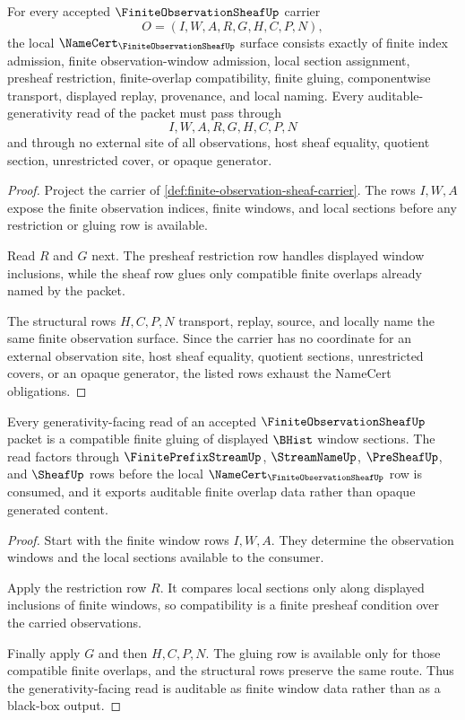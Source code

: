 \begin{theorem}
\label{thm:finite-observation-sheaf-namecert-obligations}
For every accepted $\FiniteObservationSheafUp$ carrier
$$
O=(I,W,A,R,G,H,C,P,N),
$$
the local $\NameCert_{\FiniteObservationSheafUp}$ surface consists exactly of finite index admission, finite observation-window admission, local section assignment, presheaf restriction, finite-overlap compatibility, finite gluing, componentwise transport, displayed replay, provenance, and local naming. Every auditable-generativity read of the packet must pass through
$$
I,W,A,R,G,H,C,P,N
$$
and through no external site of all observations, host sheaf equality, quotient section, unrestricted cover, or opaque generator.
\end{theorem}
\begin{proof}
Project the carrier of \autoref{def:finite-observation-sheaf-carrier}. The rows $I,W,A$ expose the finite observation indices, finite windows, and local sections before any restriction or gluing row is available.

Read $R$ and $G$ next. The presheaf restriction row handles displayed window inclusions, while the sheaf row glues only compatible finite overlaps already named by the packet.

The structural rows $H,C,P,N$ transport, replay, source, and locally name the same finite observation surface. Since the carrier has no coordinate for an external observation site, host sheaf equality, quotient sections, unrestricted covers, or an opaque generator, the listed rows exhaust the NameCert obligations.
\end{proof}

\begin{theorem}
\label{thm:finite-observation-sheaf-auditable-gluing}
Every generativity-facing read of an accepted $\FiniteObservationSheafUp$ packet is a compatible finite gluing of displayed $\BHist$ window sections. The read factors through $\FinitePrefixStreamUp$, $\StreamNameUp$, $\PreSheafUp$, and $\SheafUp$ rows before the local $\NameCert_{\FiniteObservationSheafUp}$ row is consumed, and it exports auditable finite overlap data rather than opaque generated content.
\end{theorem}
\begin{proof}
Start with the finite window rows $I,W,A$. They determine the observation windows and the local sections available to the consumer.

Apply the restriction row $R$. It compares local sections only along displayed inclusions of finite windows, so compatibility is a finite presheaf condition over the carried observations.

Finally apply $G$ and then $H,C,P,N$. The gluing row is available only for those compatible finite overlaps, and the structural rows preserve the same route. Thus the generativity-facing read is auditable as finite window data rather than as a black-box output.
\end{proof}

